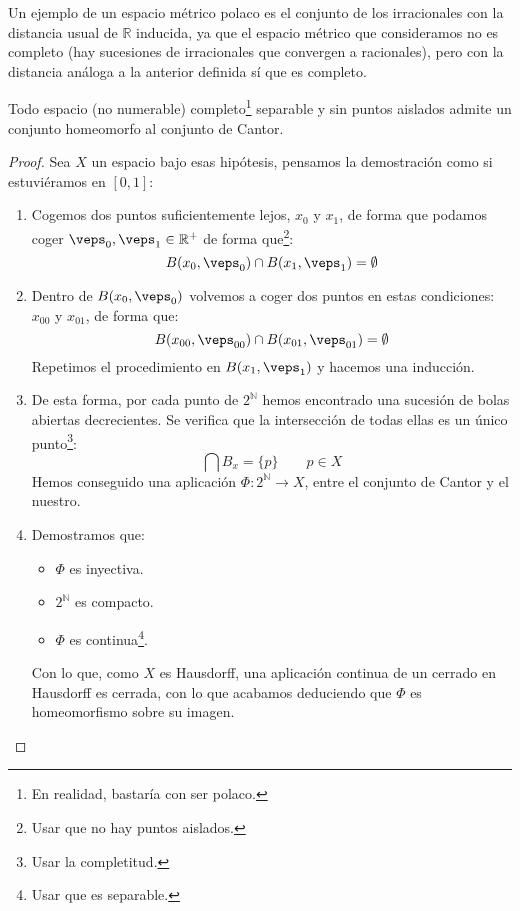 \begin{ejemplo}
    Un ejemplo de un espacio métrico polaco es el conjunto de los irracionales con la distancia usual de $\mathbb{R}$ inducida, ya que el espacio métrico que consideramos no es completo (hay sucesiones de irracionales que convergen a racionales), pero con la distancia análoga a la anterior definida sí que es completo.
\end{ejemplo}

\begin{lema}[de Cantor]
    Todo espacio (no numerable) completo\footnote{En realidad, bastaría con ser polaco.} separable y sin puntos aislados admite un conjunto homeomorfo al conjunto de Cantor.
    \begin{proof}
        Sea $X$ un espacio bajo esas hipótesis, pensamos la demostración como si estuviéramos en $[0,1]$:
        \begin{enumerate}
            \item Cogemos dos puntos suficientemente lejos, $x_0$ y $x_1$, de forma que podamos coger $\veps_0,\veps_1\in \mathbb{R}^+$ de forma que\footnote{Usar que no hay puntos aislados.}:
                \begin{equation*}
                    B(x_0,\veps_0) \cap B(x_1,\veps_1) = \emptyset 
                \end{equation*}
            \item Dentro de $B(x_0,\veps_0)$ volvemos a coger dos puntos en estas condiciones: $x_{00}$ y $x_{01}$, de forma que:
                \begin{equation*}
                    B(x_{00}, \veps_{00}) \cap B(x_{01}, \veps_{01}) = \emptyset 
                \end{equation*}
                Repetimos el procedimiento en $B(x_1,\veps_1)$ y hacemos una inducción.
            \item De esta forma, por cada punto de $2^\mathbb{N}$ hemos encontrado una sucesión de bolas abiertas decrecientes. Se verifica que la intersección de todas ellas es un único punto\footnote{Usar la completitud.}:
                \begin{equation*}
                    \bigcap B_x = \{p\} \qquad p\in X
                \end{equation*}
                Hemos conseguido una aplicación $\Phi:2^\mathbb{N}\to X$, entre el conjunto de Cantor y el nuestro.
            \item Demostramos que:
                \begin{itemize}
                    \item $\Phi$ es inyectiva.
                    \item $2^{\mathbb{N}}$ es compacto.
                    \item $\Phi$ es continua\footnote{Usar que es separable.}.
                \end{itemize}
                Con lo que, como $X$ es Hausdorff, una aplicación continua de un cerrado en Hausdorff es cerrada, con lo que acabamos deduciendo que $\Phi$ es homeomorfismo sobre su imagen.
        \end{enumerate}
    \end{proof}
\end{lema}


